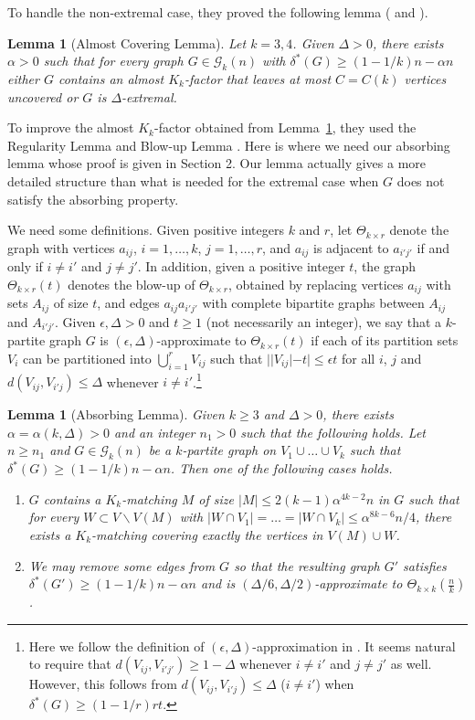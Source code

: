 \documentclass[reqno]{amsart}
\theoremstyle{plain}
\newtheorem{lemma}[theorem]{Lemma}
\def\eps{\epsilon}
\def\G{\mathcal{G}}
\begin{document}
To handle the non-extremal case, they proved the following lemma  (\cite[Lemma 2.2]{MaMa} and \cite[Lemma 2.2]{MaSz}).
\begin{lemma}[Almost Covering Lemma]
\label{lem:ac}
Let $k=3, 4$. Given $\Delta>0$, there exists $\alpha>0$ such that for every graph $G\in \G_k(n)$ with
$\delta^*(G)\ge (1 - 1/k)n - \alpha n$ either $G$ contains an almost $K_k$-factor that leaves at most $C = C(k)$ vertices uncovered or $G$ is $\Delta$-extremal.
\end{lemma}

To improve the almost $K_k$-factor obtained from Lemma~\ref{lem:ac}, they used the Regularity Lemma and Blow-up Lemma \cite{Blowup}. Here is where we need our absorbing lemma whose proof is given in Section 2. Our lemma actually gives a more detailed structure than what is needed for the extremal case when $G$ does not satisfy the absorbing property.

We need some definitions. Given positive integers $k$ and $r$, let $\Theta_{k \times r}$ denote the graph with vertices $a_{ij}$, $i=1, \dots, k$, $j=1, \dots, r$, and $a_{ij}$ is adjacent to $a_{i'j'}$ if and only if $i\ne i'$ and $j\ne j'$.  In addition, given a positive integer $t$, the graph $\Theta_{k \times r}(t)$ denotes the blow-up of $\Theta_{k \times r}$, obtained by replacing vertices $a_{ij}$ with sets $A_{ij}$ of size $t$, and edges $a_{ij} a_{i'j'}$ with complete bipartite graphs between $A_{ij}$ and $A_{i'j'}$. Given $\eps, \Delta > 0$ and $t\ge 1$ (not necessarily an integer), we say that a $k$-partite graph $G$ is $(\eps, \Delta)$-approximate to $\Theta_{k\times r}(t)$ if each of its partition sets $V_i$ can be partitioned into $\bigcup_{i=1}^r V_{ij}$ such that $||V_{ij}| - t|\le \eps t$ for all $i$, $j$ and $d(V_{ij}, V_{i'j})\le \Delta$ whenever $i\ne i'$.\footnote{Here we follow the definition of $(\eps, \Delta)$-approximation in \cite{MaMa,MaSz}. It seems natural to require that $d(V_{ij}, V_{i'j'})\ge 1- \Delta$ whenever $i\ne i'$ and $j\ne j'$ as well. However, this follows from $d(V_{ij}, V_{i'j})\le \Delta$ ($i\ne i'$) when $\delta^*(G)\ge (1 - 1/r)rt$.}

\begin{lemma}[Absorbing Lemma]
\label{lem:ab}
Given $k\ge 3$ and $\Delta>0$, there exists $\alpha = \alpha(k, \Delta)>0$ and an integer $n_1>0$ such that the following holds.  Let $n\ge n_1$ and $G\in \G_k(n)$ be a $k$-partite graph on $V_1\cup \dots \cup V_k$ such that $\delta^*(G)\ge (1 - 1/k)n - \alpha n$. Then one of the following cases holds.
\begin{enumerate}
\item $G$ contains a $K_k$-matching $M$ of size $|M|\le 2(k-1)\alpha^{4k-2}n $ in $G$ such that for every $W\subset V\backslash V(M)$ with $|W\cap V_1| = \dots = |W\cap V_k| \le \alpha^{8k-6}n/4$, there exists a $K_k$-matching covering exactly the vertices in $V(M)\cup W$.
\item We may remove some edges from $G$ so that the resulting graph $G'$ satisfies $\delta^*(G')\ge (1 - 1/k)n - \alpha n$ and is $(\Delta/6, \Delta/2)$-approximate to $\Theta_{k\times k}(\tfrac nk)$.
\end{enumerate}

\end{lemma}
\end{document}
